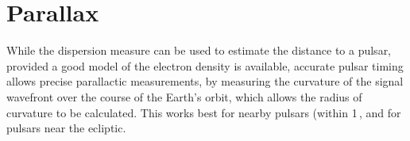 \section{Parallax}
\label{sec:parallax}

While the dispersion measure can be used to estimate the distance to a
pulsar, provided a good model of the electron density is available,
accurate pulsar timing allows precise parallactic measurements, by
measuring the curvature of the signal wavefront over the course of the
Earth's orbit, which allows the radius of curvature to be
calculated. This works best for nearby pulsars (within
1\,\kilo{}, and for pulsars near the ecliptic.

